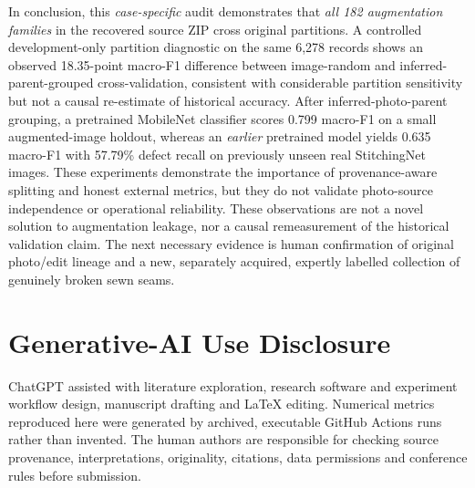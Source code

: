 \documentclass[conference,a4paper]{IEEEtran}
\begin{document}
In conclusion, this \emph{case-specific} audit demonstrates that \emph{all 182 augmentation families} in the recovered source ZIP cross original partitions. A controlled development-only partition diagnostic on the same 6,278 records shows an observed 18.35-point macro-F1 difference between image-random and inferred-parent-grouped cross-validation, consistent with considerable partition sensitivity but not a causal re-estimate of historical accuracy. After inferred-photo-parent grouping, a pretrained MobileNet classifier scores 0.799 macro-F1 on a small augmented-image holdout, whereas an \emph{earlier} pretrained model yields 0.635 macro-F1 with 57.79\% defect recall on previously unseen real StitchingNet images. These experiments demonstrate the importance of provenance-aware splitting and honest external metrics, but they do not validate photo-source independence or operational reliability. These observations are not a novel solution to augmentation leakage, nor a causal remeasurement of the historical validation claim. The next necessary evidence is human confirmation of original photo/edit lineage and a new, separately acquired, expertly labelled collection of genuinely broken sewn seams.

\section*{Generative-AI Use Disclosure}
ChatGPT assisted with literature exploration, research software and experiment workflow design, manuscript drafting and LaTeX editing. Numerical metrics reproduced here were generated by archived, executable GitHub Actions runs rather than invented. The human authors are responsible for checking source provenance, interpretations, originality, citations, data permissions and conference rules before submission.
\end{document}
